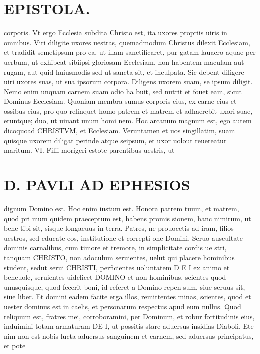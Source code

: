 \documentclass{article}
\begin{document}
\begin{pages}
\section*{EPISTOLA. }
\marginpar{[ p.2 ]}
\marginpar{[ p.10.  ]}
\marginpar{[ p.11.  ]}\pstart corporis. Vt ergo Ecclesia subdita Christo est, ita uxores propriis uiris in omnibus.  \pend\pstart Viri diligite uxores uestras, quemadmodum Christus dilexit Ecclesiam, et tradidit semetipsum pro ea, ut illam sanctificaret, pur gatam lauacro aquae per uerbum, ut exhibeat sibiipsi gloriosam Ecclesiam, non habentem maculam aut rugam, aut quid huiusmodis sed ut sancta sit, et inculpata. Sic debent diligere uiri uxores suas, ut sua ipsorum corpora. Diligens uxorem suam, se ipsum diligit. Nemo enim unquam carnem suam odio ha buit, sed nutrit et fouet eam, sicut Dominus Ecclesiam.  \pend\pstart Quoniam membra sumus corporis eius, ex carne eius et ossibus eius, pro quo relinquet homo patrem et matrem et adhaerebit uxori suae, eruntque; duo, ut uiuant unum homi nem. Hoc arcanum magnum est, ego autem dicoquoad CHRISTVM, et Ecclesiam. Veruntamen et uos singillatim, suam quisque uxorem diligat perinde atque seipsum, et uxor uolout reuereatur maritum.  \pendCAPVT VI. \pstart Filii morigeri estote parentibus uestris, ut  \pend
\section*{D. PAVLI AD EPHESIOS }
\marginpar{[ p.]}
\marginpar{[ p.]}
\marginpar{[ p.]}
\marginpar{[ p.]}\pstart dignum Domino est. Hoc enim iustum est. Honora patrem tuum, et matrem, quod pri mum quidem praeceptum est, habens promis sionem, hanc nimirum, ut bene tibi sit, sisque longaeuus in terra.  \pend\pstart Patres, ne prouocetis ad iram, filios uestros, sed educate eos, institutione et correpti one Domini.  \pend\pstart Seruo auscultate dominis carnalibus, cum timore et tremore, in simplicitate cordis ue stri, tanquam CHRISTO, non adoculum seruientes, uelut qui placere hominibus student, sedut serui CHRISTI, perficientes uoluntatem D E I ex animo et beneuole, seruientes uidelicet DOMINO et non hominibus, scientes quod unusquisque, quod fecerit boni, id referet a Domino repen sum, siue seruus sit, siue liber.  \pend\pstart Et domini eadem facite erga illos, remittentes minas, scientes, quod et uester dominus est in caelis, et personarum respectus apud eum nullus.  \pend\pstart Quod reliquum est, fratres mei, corroboramini, per Dominum, et robur fortitudinis eius, induimini totam armaturam DE I, ut possitis stare aduersus insidias Diaboli. Ete nim non est nobis lucta aduersus sanguinem et carnem, sed aduersus principatus, et pote\pend

\end{pages}
\end{document}
